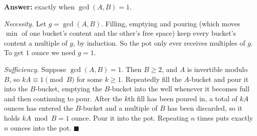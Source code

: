 \textbf{Answer:} exactly when $\boxed{\gcd(A,B)=1}$.

\emph{Necessity.} Let $g=\gcd(A,B)$. Filling, emptying and pouring (which moves $\min$ of one bucket's content and the other's free space) keep every bucket's content a multiple of $g$, by induction. So the pot only ever receives multiples of $g$. To get $1$ ounce we need $g=1$.

\emph{Sufficiency.} Suppose $\gcd(A,B)=1$. Then $B\ge2$, and $A$ is invertible modulo $B$, so $kA\equiv1\pmod B$ for some $k\ge1$. Repeatedly fill the $A$-bucket and pour it into the $B$-bucket, emptying the $B$-bucket into the well whenever it becomes full and then continuing to pour. After the $k$th fill has been poured in, a total of $kA$ ounces has entered the $B$-bucket and a multiple of $B$ has been discarded, so it holds $kA\bmod B=1$ ounce. Pour it into the pot. Repeating $n$ times puts exactly $n$ ounces into the pot. $\blacksquare$
